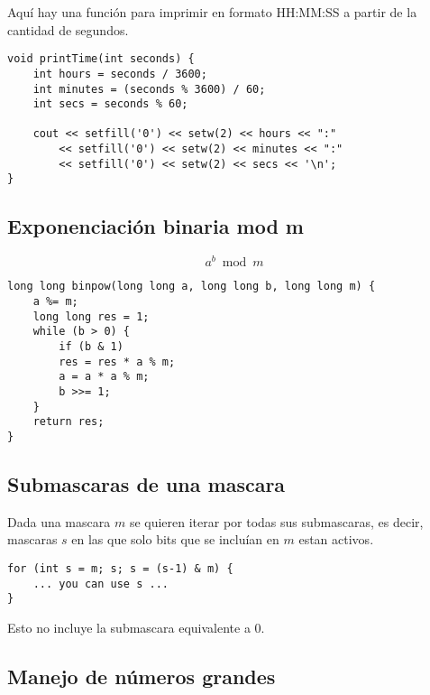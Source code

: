 \documentclass[10pt]{article}
\begin{document}
Aquí hay una función para imprimir en formato HH:MM:SS a partir de la cantidad de segundos.

\begin{lstlisting}
void printTime(int seconds) {
    int hours = seconds / 3600;
    int minutes = (seconds % 3600) / 60;
    int secs = seconds % 60;
        
    cout << setfill('0') << setw(2) << hours << ":"
        << setfill('0') << setw(2) << minutes << ":"
        << setfill('0') << setw(2) << secs << '\n';
}
\end{lstlisting}

\subsection{Exponenciación binaria mod m}

\[ a^b \bmod m \]

\begin{lstlisting}
long long binpow(long long a, long long b, long long m) {
    a %= m;
    long long res = 1;
    while (b > 0) {
        if (b & 1)
        res = res * a % m;
        a = a * a % m;
        b >>= 1;
    }
    return res;
}
\end{lstlisting}

\subsection{Submascaras de una mascara}

Dada una mascara $m$ se quieren iterar por todas sus submascaras, es decir, mascaras $s$ en las que solo bits que se incluían en $m$ estan activos.

\begin{lstlisting}
for (int s = m; s; s = (s-1) & m) {
    ... you can use s ...
}
\end{lstlisting}

Esto no incluye la submascara equivalente a 0.

\subsection{Manejo de números grandes}
\end{document}
